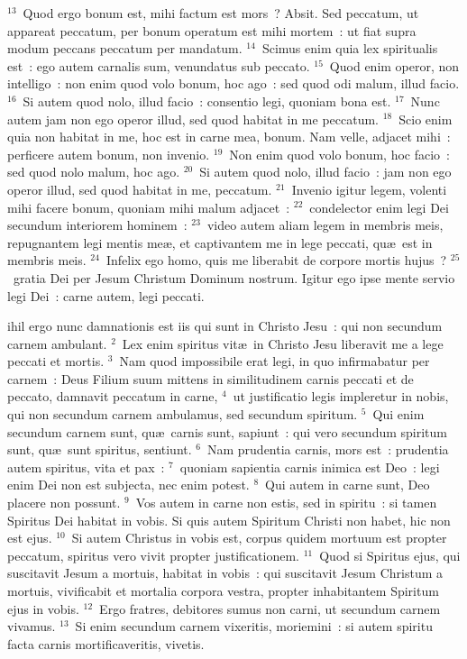 ${}^{13}$~Quod ergo bonum est, mihi factum est mors~? Absit. Sed peccatum, ut appareat peccatum, per bonum operatum est mihi mortem~: ut fiat supra modum peccans peccatum per mandatum.
${}^{14}$~Scimus enim quia lex spiritualis est~: ego autem carnalis sum, venundatus sub peccato.
${}^{15}$~Quod enim operor, non intelligo~: non enim quod volo bonum, hoc ago~: sed quod odi malum, illud facio.
${}^{16}$~Si autem quod nolo, illud facio~: consentio legi, quoniam bona est.
${}^{17}$~Nunc autem jam non ego operor illud, sed quod habitat in me peccatum.
${}^{18}$~Scio enim quia non habitat in me, hoc est in carne mea, bonum. Nam velle, adjacet mihi~: perficere autem bonum, non invenio.
${}^{19}$~Non enim quod volo bonum, hoc facio~: sed quod nolo malum, hoc ago.
${}^{20}$~Si autem quod nolo, illud facio~: jam non ego operor illud, sed quod habitat in me, peccatum.
${}^{21}$~Invenio igitur legem, volenti mihi facere bonum, quoniam mihi malum adjacet~:
${}^{22}$~condelector enim legi Dei secundum interiorem hominem~:
${}^{23}$~video autem aliam legem in membris meis, repugnantem legi mentis me\ae , et captivantem me in lege peccati, qu\ae\ est in membris meis.
${}^{24}$~Infelix ego homo, quis me liberabit de corpore mortis hujus~?
${}^{25}$~gratia Dei per Jesum Christum Dominum nostrum. Igitur ego ipse mente servio legi Dei~: carne autem, legi peccati.

\bchapter
{}ihil ergo nunc damnationis est iis qui sunt in Christo Jesu~: qui non secundum carnem ambulant.
${}^{2}$~Lex enim spiritus vit\ae\ in Christo Jesu liberavit me a lege peccati et mortis.
${}^{3}$~Nam quod impossibile erat legi, in quo infirmabatur per carnem~: Deus Filium suum mittens in similitudinem carnis peccati et de peccato, damnavit peccatum in carne,
${}^{4}$~ut justificatio legis impleretur in nobis, qui non secundum carnem ambulamus, sed secundum spiritum.
${}^{5}$~Qui enim secundum carnem sunt, qu\ae\ carnis sunt, sapiunt~: qui vero secundum spiritum sunt, qu\ae\ sunt spiritus, sentiunt.
${}^{6}$~Nam prudentia carnis, mors est~: prudentia autem spiritus, vita et pax~:
${}^{7}$~quoniam sapientia carnis inimica est Deo~: legi enim Dei non est subjecta, nec enim potest.
${}^{8}$~Qui autem in carne sunt, Deo placere non possunt.
${}^{9}$~Vos autem in carne non estis, sed in spiritu~: si tamen Spiritus Dei habitat in vobis. Si quis autem Spiritum Christi non habet, hic non est ejus.
${}^{10}$~Si autem Christus in vobis est, corpus quidem mortuum est propter peccatum, spiritus vero vivit propter justificationem.
${}^{11}$~Quod si Spiritus ejus, qui suscitavit Jesum a mortuis, habitat in vobis~: qui suscitavit Jesum Christum a mortuis, vivificabit et mortalia corpora vestra, propter inhabitantem Spiritum ejus in vobis.
${}^{12}$~Ergo fratres, debitores sumus non carni, ut secundum carnem vivamus.
${}^{13}$~Si enim secundum carnem vixeritis, moriemini~: si autem spiritu facta carnis mortificaveritis, vivetis.


